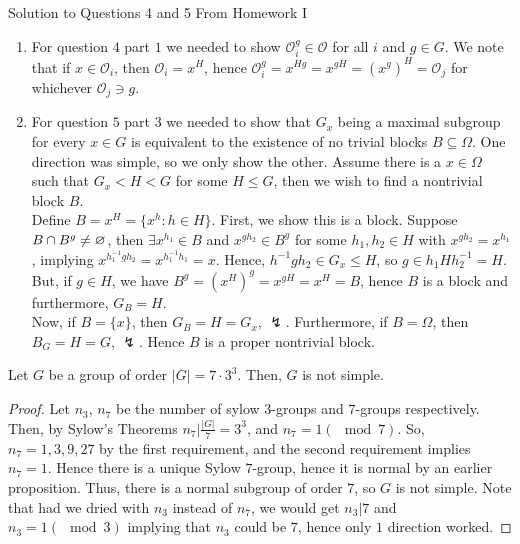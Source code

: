 \newpage
{}
\begin{note}{Solution to Questions 4 and 5 From Homework I}
	\begin{enumerate}
		\item For question \(4\) part \(1\) we needed to show \(\mathscr{O}_{i}^{g} \in \mathscr{O}\) for all \(i\) and \(g \in G\). We note that if \(x \in \mathscr{O}_{i}\), then \(\mathscr{O}_{i} = x^{H}\), hence \(\mathscr{O}_{i}^{g} = x^{Hg} = x^{gH} = \left( x^{g} \right)^{H} = \mathscr{O}_{j} \) for whichever \(\mathscr{O}_{j} \ni g\).
		\item For question \(5\) part \(3\) we needed to show that \(G_{x}\) being a maximal subgroup for every \(x \in G\) is equivalent to the existence of no trivial blocks \(B \subseteq \Omega\). One direction was simple, so we only show the other. Assume there is a \( x \in \Omega\) such that \(G_{x} < H < G\) for some \(H \le G\), then we wish to find a nontrivial block \(B\).\\
			Define \(B = x^{H} = \{x^{h} : h \in H\} \). First, we show this is a block. Suppose \(B \cap B^{g} \neq \varnothing\), then \(\exists x^{h_1} \in B\) and \(x^{gh_2} \in B^{g}\) for some \(h_1, h_2 \in H\) with \(x^{gh_2} = x^{h_1}\), implying \(x^{h_1^{-1} g h_2} = x^{h_1^{-1}h_1} = x\). Hence, \(h^{-1}g h_2 \in G_{x} \le H\), so \(g \in h_1 H h_2 ^{-1} = H\). But, if \(g \in H\), we have \(B^{g} = \left( x^{H} \right) ^{g} = x^{gH} = x^{H} = B\), hence \(B\) is a block and furthermore, \(G_{B} = H\).\\
			Now, if \(B = \{x\} \), then \(G_{B} = H = G_{x}\), \(\lightning\). Furthermore, if \(B = \Omega\), then \(B_{G} = H = G \), \(\lightning\). Hence \(B\) is a proper nontrivial block.
	\end{enumerate}
\end{note}
\begin{proposition}
	Let \(G\) be a group of order \(\left| G  \right| = 7 \cdot 3^3\). Then, \(G\) is not simple.
\end{proposition}
\begin{proof}
	Let \(n_3\), \(n_7\) be the number of sylow \(3\)-groups and \(7\)-groups respectively. Then, by Sylow's Theorems \(n_7 | \frac{\left| G \right| }{7} = 3^3\), and \(n_7 = 1 \left( \mod 7 \right) \). So, \(n_7 = 1, 3, 9, 27\) by the first requirement, and the second requirement implies \(n_7 = 1\). Hence there is a unique Sylow \(7\)-group, hence it is normal by an earlier proposition. Thus, there is a normal subgroup of order \(7\), so \(G\) is not simple. Note that had we dried with \(n_3\) instead of \(n_7\), we would get \(n_3 | 7\) and \(n_3 = 1 \left( \mod 3 \right)\) implying that \(n_3\) could be \(7\), hence only \(1\) direction worked.
\end{proof}
